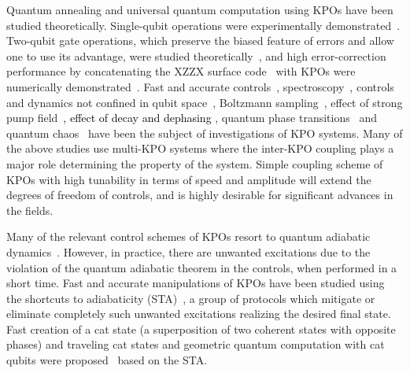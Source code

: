 \documentclass[%
 reprint,
 amsmath,amssymb,
 aps,
pra,
]{revtex4-2}
\begin{document}
Quantum annealing \cite{Goto2016,Nigg2017,Puri2017,Zhao2018,Onodera2020,Goto2020a,Kanao2021}
and universal quantum computation \cite{Cochrane1999,Goto2016b,Puri2017b} using KPOs have been studied theoretically.
Single-qubit operations were experimentally demonstrated~\cite{Grimm2020}.
Two-qubit gate operations, which preserve the biased feature of errors and allow one to use its advantage, were studied theoretically~\cite{Puri2020}, and 
high error-correction performance by concatenating the XZZX surface code~\cite{Ataides2021} with KPOs were numerically demonstrated~\cite{Darmawan2021}.
Fast and accurate controls~\cite{Kanao2021b,Xu2021,Kang2021}, spectroscopy~\cite{Yamaji2021,Masuda2021b}, controls and dynamics not confined in qubit space~\cite{Zhang2017,Wang2019}, Boltzmann sampling~\cite{Goto2018}, effect of strong pump field~\cite{Masuda2020}\textcolor{black}{, effect of decay and dephasing \cite{Puri2017b}}, quantum phase transitions~\cite{Dykman2018,Rota2019} and quantum chaos~\cite{Milburn1991,Hovsepyan2016,Goto2021b} have been the subject of investigations of KPO systems.
Many of the above studies use multi-KPO systems where the inter-KPO coupling plays a major role determining the property of the system.
Simple coupling scheme of KPOs with high tunability in terms of speed and amplitude will extend the degrees of freedom of controls, and is highly desirable for significant advances in the fields.

Many of the relevant control schemes of KPOs resort to quantum adiabatic dynamics~\cite{Goto2019}.
However, in practice, there are unwanted excitations due to the violation of the quantum adiabatic theorem in the controls, when performed in a short time.
Fast and accurate manipulations of KPOs have been studied using the shortcuts to adiabaticity (STA)~\cite{Rice2003,Torrontegui2013,Masuda2015,Masuda2016,Palmero2016,Campo2019,Guery-Odelin2019,Lizuain2019}, a group of protocols which mitigate or eliminate completely such unwanted excitations realizing the desired final state.
Fast creation of a cat state (a superposition of two coherent states with opposite phases) \cite{Puri2017} and traveling cat states \cite{Goto2019b} and
geometric quantum computation with cat qubits were proposed~\cite{Kang2021} based on the STA.

\end{document}
